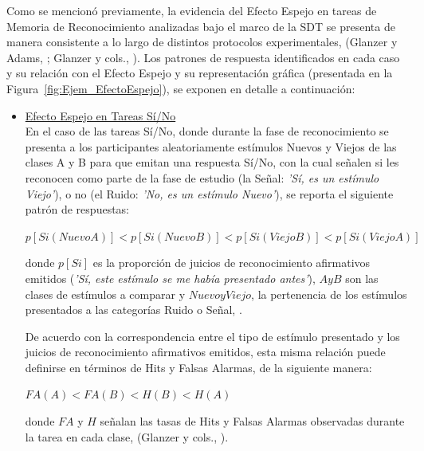 Como se mencionó previamente, la evidencia del Efecto Espejo en tareas de Memoria de Reconocimiento analizadas bajo el marco de la SDT se presenta de manera consistente a lo largo de distintos protocolos experimentales, (Glanzer y Adams, \citep{Glanzer1990}; Glanzer y cols., \citeyear{Glanzer1993}). Los patrones de respuesta identificados en cada caso y su relación con el Efecto Espejo y su representación gráfica (presentada en la Figura~\ref{fig:Ejem_EfectoEspejo}), se exponen en detalle a continuación:\\

\begin{itemize}
\item \underline{Efecto Espejo en Tareas Sí/No}\\

En el caso de las tareas Sí/No, donde durante la fase de reconocimiento se presenta a los participantes aleatoriamente estímulos Nuevos y Viejos de las clases A y B para que emitan una respuesta Sí/No, con la cual señalen si les reconocen como parte de la fase de estudio (la Señal: \textit{'Sí, es un estímulo Viejo'}), o no (el Ruido: \textit{'No, es un estímulo Nuevo'}), se reporta el siguiente patrón de respuestas:\\

\begin{center}
$p[Si(NuevoA)] < p[Si(NuevoB)] < p[Si(ViejoB)] < p[Si(ViejoA)]$\\
\end{center}
\begin{center}
donde $p[Si]$ es la proporción de juicios de reconocimiento afirmativos emitidos (\textit{'Sí, este estímulo se me había presentado antes'}), $A y B$ son las clases de estímulos a comparar y $Nuevo y Viejo$, la pertenencia de los estímulos presentados a las categorías Ruido o Señal, \citep{Glanzer1993}.\\
\end{center}

De acuerdo con la correspondencia entre el tipo de estímulo presentado y los juicios de reconocimiento afirmativos emitidos, esta misma relación puede definirse en términos de Hits y Falsas Alarmas, de la siguiente manera:\\

\begin{center}
$FA(A) < FA(B) < H(B) < H(A)$\\
\end{center}
\begin{center}
donde $FA$ y $H$ señalan las tasas de Hits y Falsas Alarmas observadas durante la tarea en cada clase, (Glanzer y cols., \citeyear{Glanzer1993}).\\
\end{center}


\end{itemize}
